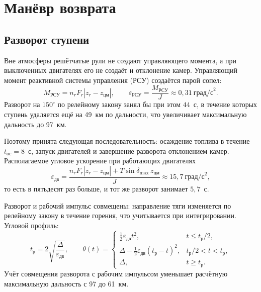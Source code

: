 \documentclass[11pt,a4paper]{article}
\begin{document}
\section{Манёвр возврата}

\subsection{Разворот ступени}

Вне атмосферы решётчатые рули не создают управляющего момента, а при выключенных
двигателях его не создаёт и отклонение камер. Управляющий момент реактивной
системы управления (РСУ) создаётся парой сопел:
\begin{equation}
M_{\text{РСУ}} = n_r F_r \left\lvert z_r - z_{\text{цм}}\right\rvert,
\qquad
\varepsilon_{\text{РСУ}} = \frac{M_{\text{РСУ}}}{J}
 \approx 0{,}31\ \text{град/с}^2 .
\end{equation}
Разворот на $150^\circ$ по релейному закону занял бы при этом $44$~с, в течение
которых ступень удаляется ещё на 49~км по дальности, что увеличивает
максимальную дальность до 97~км.

Поэтому принята следующая последовательность: осаждение топлива в течение
$t_{\text{ос}}=8$~с, запуск двигателей и завершение разворота отклонением камер.
Располагаемое угловое ускорение при работающих двигателях
\begin{equation}
\varepsilon_{\text{дв}}
 = \frac{n_r F_r\left\lvert z_r - z_{\text{цм}}\right\rvert
   + T\sin\delta_{\max}\,z_{\text{цм}}}{J}
 \approx 15{,}7\ \text{град/с}^2 ,
\end{equation}
то есть в пятьдесят раз больше, и тот же разворот занимает $5{,}7$~с.

Разворот и рабочий импульс совмещены: направление тяги изменяется по релейному
закону в течение горения, что учитывается при интегрировании. Угловой профиль:
\begin{equation}
t_{\text{р}} = 2\sqrt{\frac{\Delta}{\varepsilon_{\text{дв}}}},
\qquad
\theta(t)=\begin{cases}
\tfrac12\varepsilon_{\text{дв}} t^2, & t\le t_{\text{р}}/2,\\[1ex]
\Delta-\tfrac12\varepsilon_{\text{дв}}\left(t_{\text{р}}-t\right)^2,
 & t_{\text{р}}/2<t<t_{\text{р}},\\[1ex]
\Delta, & t\ge t_{\text{р}} .
\end{cases}
\end{equation}
Учёт совмещения разворота с рабочим импульсом уменьшает расчётную максимальную
дальность с 97 до 61~км.
\end{document}
